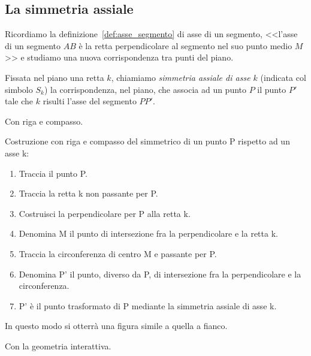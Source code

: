 \subsection{La simmetria assiale}

\noindent\begin{minipage}{0.65\textwidth}\parindent15pt

Ricordiamo la definizione~\ref{def:asse_segmento} di asse di un 
segmento, <<l'asse di un segmento $AB$ è la retta perpendicolare al 
segmento nel suo punto medio $M$>> e studiamo una nuova 
corrispondenza tra punti del piano.
\end{minipage}\hfill
\begin{minipage}{0.25\textwidth}
  \centering 
\end{minipage}
\begin{definizione}
Fissata nel piano una retta $k$, chiamiamo \emph{simmetria assiale di 
asse $k$} (indicata col simbolo $S_k$) la corrispondenza, nel piano, 
che associa ad un punto $P$ il punto $P'$ tale che $k$ risulti l'asse 
del segmento $PP'$.
\end{definizione}

Con riga e compasso.

\begin{procedura}
  Costruzione con riga e compasso del simmetrico di un punto P rispetto ad un 
asse k:
  \begin{enumerate} [nosep]
    \item 
    Traccia il punto P.
    \item 
    Traccia la retta k non passante per P.
    \item 
    Costruisci la perpendicolare per P alla retta k.
    \item 
    Denomina M il punto di intersezione fra la perpendicolare e la retta k.
    \item 
    Traccia la circonferenza di centro M e passante per P.
    \item 
    Denomina P' il punto, diverso da P, di intersezione fra la perpendicolare e 
la circonferenza. 
    \item 
    P' è il punto trasformato di P mediante la simmetria assiale di asse k.
  \end{enumerate}
\end{procedura}
In questo modo si otterrà una figura simile a quella a fianco.

Con la geometria interattiva.

